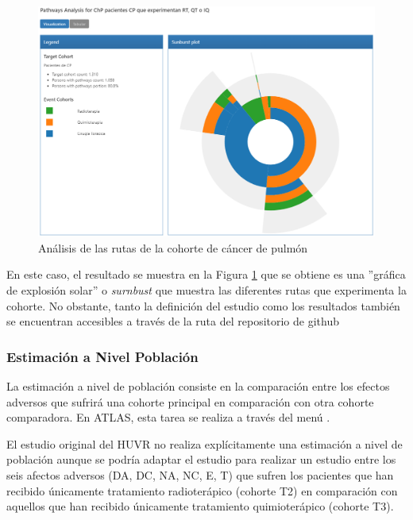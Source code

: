 \begin{figure}[H]
    \centering
    \includegraphics[width=1\textwidth]{figures/pathway.png}
    \caption{Análisis de las rutas de la cohorte de cáncer de pulmón}
    \label{table:pathway}
\end{figure}

En este caso, el resultado se muestra en la Figura \ref{table:pathway} que se obtiene es una ''gráfica de explosión solar'' o \textit{surnbust} que muestra las diferentes rutas que experimenta la cohorte. No obstante, tanto la definición del estudio como los resultados también se encuentran accesibles a través de la ruta del repositorio de github  


\subsubsection{Estimación a Nivel Población}

La estimación a nivel de población consiste en la comparación entre los efectos adversos que sufrirá una cohorte principal en comparación con otra cohorte comparadora. En ATLAS, esta tarea se realiza a través del menú .

El estudio original del HUVR no realiza explícitamente una estimación a nivel de población aunque se podría adaptar el estudio para realizar un estudio entre los seis afectos adversos (DA, DC, NA, NC, E, T) que sufren los pacientes que han recibido únicamente tratamiento radioterápico (cohorte T2) en comparación con aquellos que han recibido únicamente tratamiento quimioterápico (cohorte T3).

